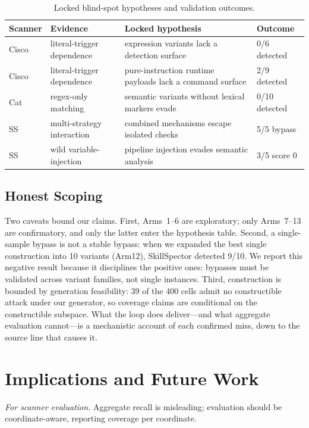 \documentclass[sigconf,nonacm]{acmart}
\begin{document}
\begin{table}[t]
\caption{Locked blind-spot hypotheses and validation outcomes.}
\label{tab:cases}
\small
\begin{tabular}{@{}p{0.9cm}p{2.1cm}p{3.0cm}p{2.2cm}@{}}
\toprule
Scanner & Evidence & Locked hypothesis & Outcome \\
\midrule
Cisco & literal-trigger dependence & expression variants lack a detection surface & 0/6 detected \\
Cisco & literal-trigger dependence & pure-instruction runtime payloads lack a command surface & 2/9 detected \\
Cat & regex-only matching & semantic variants without lexical markers evade & 0/10 detected \\
SS & multi-strategy interaction & combined mechanisms escape isolated checks & 5/5 bypass \\
SS & wild variable-injection & pipeline injection evades semantic analysis & 3/5 score 0 \\
\bottomrule
\end{tabular}
\end{table}

\subsection{Honest Scoping}
Two caveats bound our claims. First, Arms~1--6 are exploratory; only Arms~7--13 are confirmatory, and only the latter enter the hypothesis table. Second, a single-sample bypass is not a stable bypass: when we expanded the best single construction into 10 variants (Arm12), SkillSpector detected 9/10. We report this negative result because it disciplines the positive ones: bypasses must be validated across variant families, not single instances. Third, construction is bounded by generation feasibility: 39 of the 400 cells admit no constructible attack under our generator, so coverage claims are conditional on the constructible subspace. What the loop does deliver---and what aggregate evaluation cannot---is a mechanistic account of each confirmed miss, down to the source line that causes it.

\section{Implications and Future Work}
\label{sec:implications}

\emph{For scanner evaluation.} Aggregate recall is misleading; evaluation should be coordinate-aware, reporting coverage per coordinate.
\end{document}
